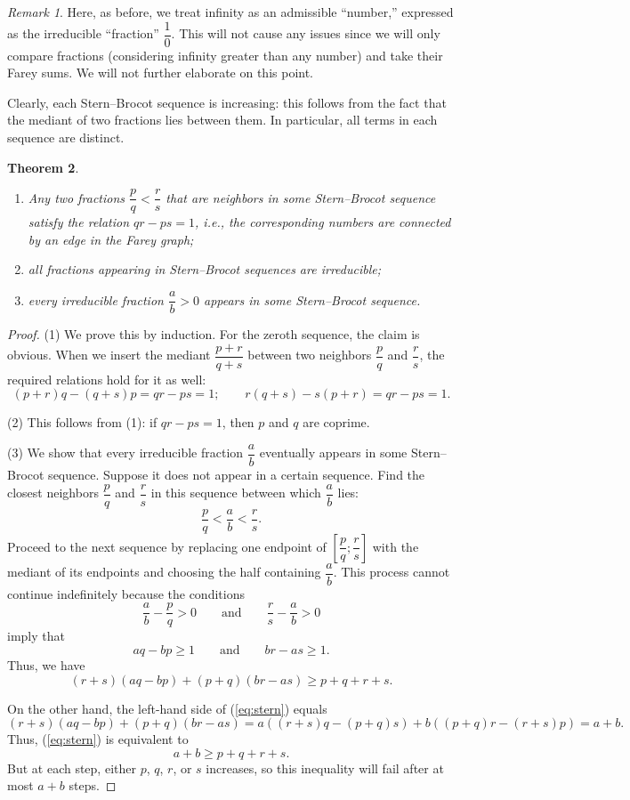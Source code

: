 \documentclass[a4paper,11pt]{amsart}
\theoremstyle{plain}
\newtheorem{theorem}{Theorem}[section]
\theoremstyle{remark}
\newtheorem{remark}[theorem]{Remark}
\theoremstyle{definition}
\numberwithin{equation}{section}
\numberwithin{figure}{section}
\begin{document}
\begin{remark}
Here, as before, we treat infinity as an admissible ``number,'' expressed as the irreducible ``fraction'' $\dfrac 10$. This will not cause any issues since we will only compare fractions (considering infinity greater than any number) and take their Farey sums. We will not further elaborate on this point.
\end{remark}

Clearly, each Stern--Brocot sequence is increasing: this follows from the fact that the mediant of two fractions lies between them. In particular, all terms in each sequence are distinct.

\begin{theorem}\label{thm:stern}
\begin{enumerate} 
\item Any two fractions $\dfrac pq<\dfrac rs$ that are neighbors in some Stern--Brocot sequence satisfy the relation $qr-ps=1$, i.e., the corresponding numbers are connected by an edge in the Farey graph;

\item all fractions appearing in Stern--Brocot sequences are irreducible;

\item every irreducible fraction $\dfrac ab>0$ appears in some Stern--Brocot sequence.
\end{enumerate}
\end{theorem}

\begin{proof}
(1) We prove this by induction. For the zeroth sequence, the claim is obvious. When we insert the mediant $\dfrac {p+r}{q+s}$ between two neighbors $\dfrac pq$ and $\dfrac rs$, the required relations hold for it as well:
\[
(p+r)q-(q+s)p=qr-ps=1;\qquad r(q+s)-s(p+r)=qr-ps=1.
\]

(2) This follows from (1): if $qr-ps=1$, then $p$ and $q$ are coprime.

(3) We show that every irreducible fraction $\dfrac ab$ eventually appears in some Stern--Brocot sequence. Suppose it does not appear in a certain sequence. Find the closest neighbors $\dfrac pq$ and $\dfrac rs$ in this sequence between which $\dfrac ab$ lies:
\[
\dfrac pq< \dfrac ab< \dfrac rs.
\]
Proceed to the next sequence by replacing one endpoint of $\left[\dfrac pq;\dfrac rs\right]$ with the mediant of its endpoints and choosing the half containing $\dfrac ab$. This process cannot continue indefinitely because the conditions
\[
\dfrac ab-\dfrac pq>0 \qquad\text{and}\qquad \dfrac rs-\dfrac ab>0
\]
imply that
\[
aq-bp\geq 1 \qquad\text{and}\qquad br-as\geq 1.
\]
Thus, we have
\begin{equation}\label{eq:stern}
(r+s)(aq-bp)+(p+q)(br-as)\geq p+q+r+s.
\end{equation}

On the other hand, the left-hand side of (\ref{eq:stern}) equals
\[
(r+s)(aq-bp)+(p+q)(br-as) = a((r+s)q-(p+q)s) + b((p+q)r-(r+s)p) = a+b.
\]
Thus, (\ref{eq:stern}) is equivalent to
\[
a+b\geq p+q+r+s.
\]
But at each step, either $p$, $q$, $r$, or $s$ increases, so this inequality will fail after at most $a+b$ steps.
\end{proof}
\end{document}
